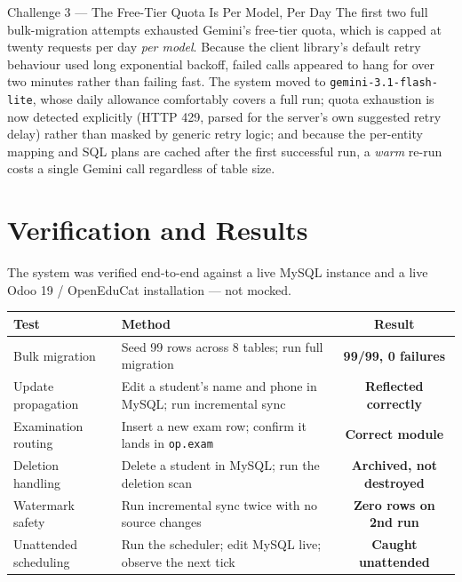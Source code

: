 \documentclass[11pt,a4paper]{article}
\begin{document}
\vspace{0.7em}
\begin{challengebox}{Challenge 3 --- The Free-Tier Quota Is Per Model, Per Day}
The first two full bulk-migration attempts exhausted Gemini's free-tier quota, which is capped at twenty requests per day \emph{per model}. Because the client library's default retry behaviour used long exponential backoff, failed calls appeared to hang for over two minutes rather than failing fast.
\tcblower
The system moved to \texttt{gemini-3.1-flash-lite}, whose daily allowance comfortably covers a full run; quota exhaustion is now detected explicitly (HTTP 429, parsed for the server's own suggested retry delay) rather than masked by generic retry logic; and because the per-entity mapping and SQL plans are cached after the first successful run, a \emph{warm} re-run costs a single Gemini call regardless of table size.
\end{challengebox}

\newpage
\section{Verification and Results}

The system was verified end-to-end against a live MySQL instance and a live Odoo 19 / OpenEduCat installation --- not mocked.

\begin{table}[h]
\centering
\begin{tabularx}{\textwidth}{@{}>{\raggedright\arraybackslash}p{4.6cm}>{\raggedright\arraybackslash}Xc@{}}
\toprule
\rowcolor{navy!10}
\textbf{\color{navy}Test} & \textbf{\color{navy}Method} & \textbf{\color{navy}Result} \\
\midrule
Bulk migration & Seed 99 rows across 8 tables; run full migration & \color{teal!60!black}\bfseries 99/99, 0 failures \\
Update propagation & Edit a student's name and phone in MySQL; run incremental sync & \color{teal!60!black}\bfseries Reflected correctly \\
Examination routing & Insert a new exam row; confirm it lands in \texttt{op.exam} & \color{teal!60!black}\bfseries Correct module \\
Deletion handling & Delete a student in MySQL; run the deletion scan & \color{teal!60!black}\bfseries Archived, not destroyed \\
Watermark safety & Run incremental sync twice with no source changes & \color{teal!60!black}\bfseries Zero rows on 2nd run \\
Unattended scheduling & Run the scheduler; edit MySQL live; observe the next tick & \color{teal!60!black}\bfseries Caught unattended \\
\bottomrule
\end{tabularx}
\end{table}
\end{document}
